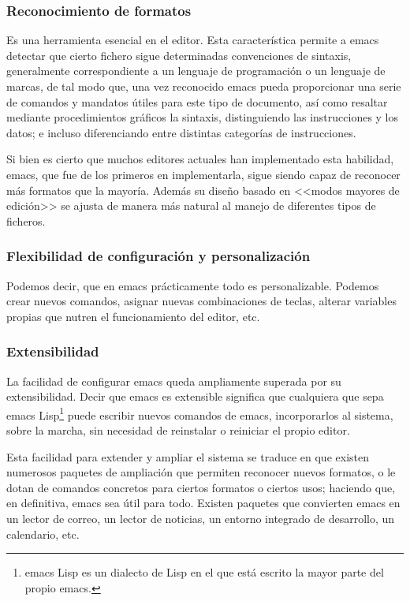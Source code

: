 \documentclass[a4paper, 11pt, titlepage]{book}
\begin{document}
            \subsubsection{Reconocimiento de formatos} Es una herramienta esencial en 
            el editor. Esta característica permite a emacs detectar que cierto fichero 
            sigue determinadas convenciones de sintaxis, generalmente correspondiente a 
            un lenguaje de programación o un lenguaje de marcas, de tal modo que, una vez 
            reconocido emacs pueda proporcionar una serie de comandos y mandatos útiles 
            para este tipo de documento, así como resaltar mediante procedimientos gráficos 
            la sintaxis, distinguiendo las instrucciones y los datos; e incluso 
            diferenciando entre distintas categorías de instrucciones.

            Si bien es cierto que muchos editores actuales han implementado esta habilidad, 
            emacs, que fue de los primeros en implementarla, sigue siendo capaz de reconocer 
            más formatos que la mayoría. Además su diseño basado en <<modos mayores de edición>>
            se ajusta de manera más natural al manejo de diferentes tipos de ficheros.

            \subsubsection{Flexibilidad de configuración y personalización} Podemos decir, 
            que en emacs prácticamente todo es personalizable. Podemos crear nuevos comandos, 
            asignar nuevas combinaciones de teclas, alterar variables propias que nutren el 
            funcionamiento del editor, etc. 

            \subsubsection{Extensibilidad} La facilidad de configurar emacs queda ampliamente 
            superada por su extensibilidad. Decir que emacs es extensible significa que 
            cualquiera que sepa emacs Lisp\footnote{emacs Lisp es un dialecto de Lisp en el que está escrito 
            la mayor parte del propio emacs.} puede escribir nuevos comandos de emacs, incorporarlos al 
            sistema, sobre la marcha, sin necesidad de reinstalar o reiniciar el propio editor.

            Esta facilidad para extender y ampliar el sistema se traduce en que existen numerosos 
            paquetes de ampliación que permiten reconocer nuevos formatos, o le dotan de comandos 
            concretos para ciertos formatos o ciertos usos; haciendo que, en definitiva, emacs 
            sea útil para todo. Existen paquetes que convierten emacs en un lector de correo, 
            un lector de noticias, un entorno integrado de desarrollo, un calendario, etc.
\end{document}
